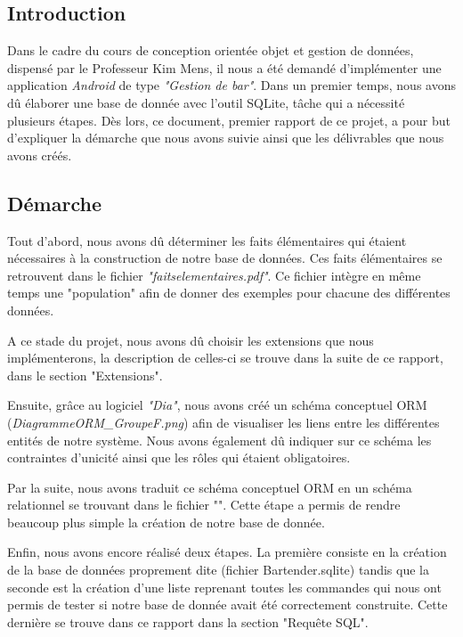 \documentclass[11pt, a4, oneside, headings=normal]{scrreprt}
\begin{document}


\subsection*{Introduction}

Dans le cadre du cours de conception orientée objet et gestion de données, dispensé par le Professeur Kim Mens, il nous a été demandé d'implémenter une application \textit{Android} de type \textit{"Gestion de bar"}. Dans un premier temps, nous avons dû élaborer une base de donnée avec l'outil SQLite, tâche qui a nécessité plusieurs étapes. Dès lors, ce document, premier rapport de ce projet, a pour but d'expliquer la démarche que nous avons suivie ainsi que les délivrables que nous avons créés.

\subsection*{Démarche}

Tout d'abord, nous avons dû déterminer les faits élémentaires qui étaient nécessaires à la construction de notre base de données. Ces faits élémentaires se retrouvent dans le fichier \textit{"faitselementaires.pdf"}. Ce fichier intègre en même temps une "population" afin de donner des exemples pour chacune des différentes données.

A ce stade du projet, nous avons dû choisir les extensions que nous implémenterons, la description de celles-ci se trouve dans la suite de ce rapport, dans le section "Extensions".

Ensuite, grâce au logiciel \textit{"Dia"}, nous avons créé un schéma conceptuel ORM (\textit{DiagrammeORM\_GroupeF.png}) afin de visualiser les liens entre les différentes entités de notre système. Nous avons également dû indiquer sur ce schéma les contraintes d'unicité ainsi que les rôles qui étaient obligatoires.

Par la suite, nous avons traduit ce schéma conceptuel ORM en un schéma relationnel se trouvant dans le fichier "". Cette étape a permis de rendre beaucoup plus simple la création de notre base de donnée.

Enfin, nous avons encore réalisé deux étapes. La première consiste en la création de la base de données proprement dite (fichier Bartender.sqlite) tandis que la seconde est la création d'une liste reprenant toutes les commandes qui nous ont permis de tester si notre base de donnée avait été correctement construite. Cette dernière se trouve dans ce rapport dans la section "Requête SQL".
\end{document}
